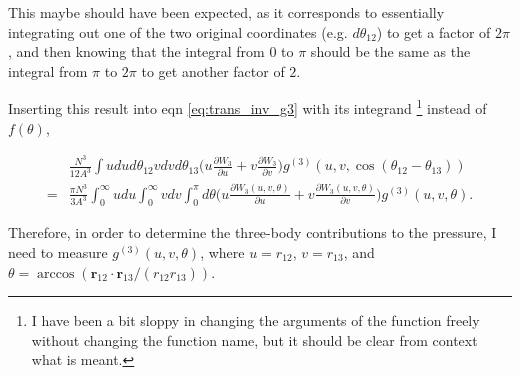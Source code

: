 \documentclass[../main.tex]{subfiles}
\begin{document}
This maybe should have been expected, as it corresponds to essentially
integrating out one of the two original coordinates (e.g. $d\theta_{12}$)
to get a factor of $2\pi$, and then knowing that the integral from $0$ to
$\pi$ should be the same as the integral from $\pi$ to $2\pi$ to get another
factor of $2$.
  
Inserting this result into eqn \ref{eq:trans_inv_g3} with its integrand
\footnote{I have been a bit sloppy in changing the arguments of the function
  freely without changing the function name, but it should be clear from
  context what is meant.}
instead of $f(\theta)$,
\begin{widetext}
  \begin{align}
    &\frac{N^3}{12A^3}\int udud\theta_{12}vdvd\theta_{13}\bigg(
    u\frac{\partial W_3}{\partial u}+
    v\frac{\partial W_3}{\partial v}
    \bigg)g^{(3)}(u,v,\cos(\theta_{12}-\theta_{13}))\nonumber\\
    =&\frac{\pi N^3}{3A^3}\int_{0}^{\infty} udu\int_{0}^{\infty}vdv
    \int_{0}^{\pi}d\theta\bigg(
    u\frac{\partial W_3(u,v,\theta)}{\partial u}+
    v\frac{\partial W_3(u,v,\theta)}{\partial v}
    \bigg)g^{(3)}(u,v,\theta).
  \end{align}
\end{widetext}

Therefore, in order to determine the three-body contributions to the pressure,
I need to measure $g^{(3)}(u,v,\theta)$, where $u=r_{12}$, $v=r_{13}$, and
$\theta=\arccos(\bm{r}_{12}\cdot\bm{r}_{13}/(r_{12}r_{13}))$.
\end{document}
